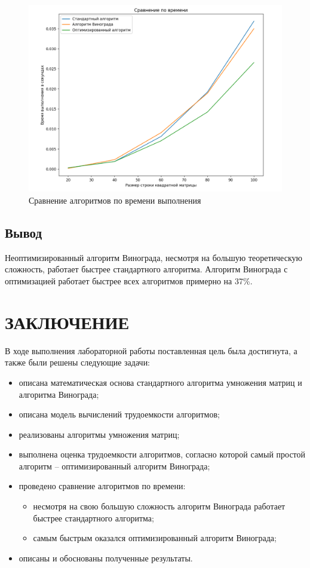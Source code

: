 \documentclass{article}
\begin{document}
\begin{figure}[h]
	\centering
	\includegraphics[scale=0.7]{tools/Screenshot_1.png}
	\caption{Сравнение алгоритмов по времени выполнения}
\end{figure}

\subsection{Вывод}
Неоптимизированный алгоритм Винограда, несмотря на большую теоретическую сложность, работает быстрее стандартного 
алгоритма. Алгоритм Винограда с оптимизацией работает быстрее всех алгоритмов примерно на 37\%.


\clearpage\section*{ЗАКЛЮЧЕНИЕ}
В ходе выполнения лабораторной работы поставленная цель была достигнута, а также были решены следующие задачи:
\begin{itemize}
	\item описана математическая основа стандартного алгоритма умножения матриц и алгоритма Винограда;
	\item описана модель вычислений трудоемкости алгоритмов; 
	\item реализованы алгоритмы умножения матриц;
	\item выполнена оценка трудоемкости алгоритмов, согласно которой самый простой алгоритм -- оптимизированный
	алгоритм Винограда;
	\item проведено сравнение алгоритмов по времени:
	\begin{itemize}
		\item несмотря на свою большую сложность алгоритм Винограда работает быстрее стандартного алгоритма;
		\item самым быстрым оказался оптимизированный алгоритм Винограда;
	\end{itemize}
	\item описаны и обоснованы полученные результаты.
\end{itemize} 
\end{document}
